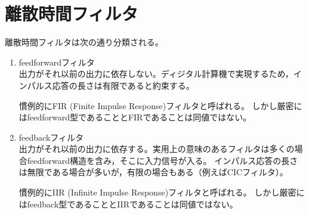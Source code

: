 \chapter{離散時間フィルタ}
    離散時間フィルタは次の通り分類される。
    \begin{enumerate}
        \item feedforwardフィルタ\\
        出力がそれ以前の出力に依存しない。ディジタル計算機で実現するため，インパルス応答の長さは有限であると約束する。
        \par
        慣例的にFIR (Finite Impulse Response)フィルタと呼ばれる。
        しかし厳密にはfeedforward型であることとFIRであることは同値ではない。
        \item feedbackフィルタ\\
        出力がそれ以前の出力に依存する。実用上の意味のあるフィルタは多くの場合feedforward構造を含み，そこに入力信号が入る。
        インパルス応答の長さは無限である場合が多いが，有限の場合もある（例えばCICフィルタ）。
        \par
        慣例的にIIR (Infinite Impulse Response)フィルタと呼ばれる。
        しかし厳密にはfeedback型であることとIIRであることは同値ではない。
    \end{enumerate}
    
    
    
    
    
    
